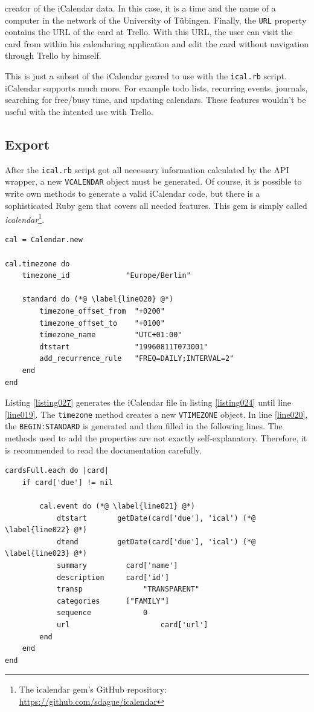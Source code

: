 creator of the iCalendar data. In this case, it is a time and the name of a computer in the network of the University of Tübingen. Finally, the \lstinline{URL} property contains the URL of the card at Trello. With this URL, the user can visit the card from within his calendaring application and edit the card without navigation through Trello by himself. \cite{ical:specs}

This is just a subset of the iCalendar geared to use with the \texttt{ical.rb} script. iCalendar supports much more. For example todo lists, recurring events, journals, searching for free/busy time, and updating calendars. These features wouldn't be useful with the intented use with Trello. 

\subsection{Export}

After the \texttt{ical.rb} script got all necessary information calculated by the API wrapper, a new \lstinline{VCALENDAR} object must be generated. Of course, it is possible to write own methods to generate a valid iCalendar code, but there is a sophisticated Ruby gem that covers all needed features. This gem is simply called \emph{icalendar}\footnote{The icalendar gem's GitHub repository: \url{https://github.com/sdague/icalendar}}.

\begin{lstlisting}[aboveskip=1\baselineskip, caption=Generating a new \lstinline{VCALENDAR}., label=listing027]
cal = Calendar.new

cal.timezone do
	timezone_id             "Europe/Berlin"
	
	standard do (*@ \label{line020} @*)
		timezone_offset_from  "+0200"
		timezone_offset_to    "+0100"
		timezone_name         "UTC+01:00"
		dtstart               "19960811T073001"
		add_recurrence_rule   "FREQ=DAILY;INTERVAL=2"
	end
end
\end{lstlisting}

Listing \ref{listing027} generates the iCalendar file in listing \ref{listing024} until line \ref{line019}. The \lstinline{timezone} method creates a new \lstinline{VTIMEZONE} object. In line \ref{line020}, the \lstinline{BEGIN:STANDARD} is generated and then filled in the following lines. The methods used to add the properties ​​are not exactly self-explanatory. Therefore, it is recommended to read the documentation carefully.

\begin{lstlisting}[aboveskip=1\baselineskip, style=bash, caption=Generating the \lstinline{VEVENT} object., label=listing027]
cardsFull.each do |card|
	if card['due'] != nil	
		
		cal.event do (*@ \label{line021} @*)
			dtstart       getDate(card['due'], 'ical') (*@ \label{line022} @*)
			dtend         getDate(card['due'], 'ical') (*@ \label{line023} @*)
			summary     	card['name']
			description 	card['id']
			transp				"TRANSPARENT"
			categories		["FAMILY"]
			sequence			0
			url						card['url']
		end		
	end
end
\end{lstlisting}

